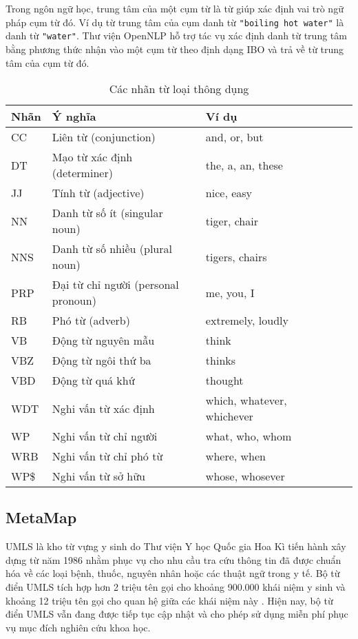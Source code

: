 Trong ngôn ngữ học, trung tâm của một cụm từ là từ giúp xác định vai trò ngữ pháp cụm từ đó. Ví dụ từ trung tâm của cụm danh từ \texttt{"boiling hot water"} là danh từ \texttt{"water"}. Thư viện OpenNLP hỗ trợ tác vụ xác định danh từ trung tâm bằng phương thức nhận vào một cụm từ theo định dạng IBO và trả về từ trung tâm của cụm từ đó.

\begin{table}[ht]
\centering{}
\caption{Các nhãn từ loại thông dụng \label{tab:POSTag}}
\footnotesize\sffamily

\begin{tabularx}{0.8\textwidth}{@{}l *5{>{\arraybackslash}X}@{}}
\toprule 
\textbf{Nhãn} & \textbf{Ý nghĩa} & \textbf{Ví dụ}\\
\midrule
CC & Liên từ (conjunction) & and, or, but\\
DT & Mạo từ xác định (determiner) & the, a, an, these\\
JJ & Tính từ (adjective) & nice, easy \\
NN & Danh từ số ít (singular noun) & tiger, chair \\
NNS & Danh từ số nhiều (plural noun) & tigers, chairs \\
PRP & Đại từ chỉ người (personal pronoun) & me, you, I \\
RB & Phó từ (adverb) & extremely, loudly \\
VB & Động từ nguyên mẫu & think  \\
VBZ & Động từ ngôi thứ ba & thinks \\
VBD & Động từ quá khứ & thought \\
WDT & Nghi vấn từ xác định & which, whatever, whichever\\
WP & Nghi vấn từ chỉ người & what, who, whom \\
WRB & Nghi vấn từ chỉ phó từ & where, when \\
WP\$ & Nghi vấn từ sở hữu & whose, whosever \\
\bottomrule
\end{tabularx}
\end{table}

\subsection*{MetaMap}
UMLS là kho từ vựng y sinh do Thư viện Y học Quốc gia Hoa Kì tiến hành xây dựng từ năm 1986 nhằm phục vụ cho nhu cầu tra cứu thông tin đã được chuẩn hóa về các loại bệnh, thuốc, nguyên nhân hoặc các thuật ngữ trong y tế. Bộ từ điển UMLS tích hợp hơn 2 triệu tên gọi cho khoảng 900.000 khái niệm y sinh và khoảng 12 triệu tên gọi cho quan hệ giữa các khái niệm này \cite{Olivier2004}. Hiện nay, bộ từ điển UMLS vẫn đang được tiếp tục cập nhật và cho phép sử dụng miễn phí phục vụ mục đích nghiên cứu khoa học.

